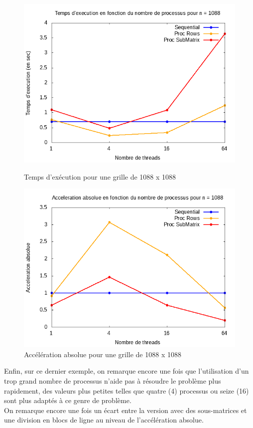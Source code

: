 \documentclass[10pt,a4paper]{article}
\begin{document}
\newpage
\begin{figure}[h]
  \centering
  \begin{minipage}[b]{0.49\textwidth}
	\includegraphics[width=\textwidth]{./Time/size_1088_time.png}
    \caption{Temps d'exécution pour une grille de 1088 x 1088}
  \end{minipage}
  \hfill
  \begin{minipage}[b]{0.49\textwidth}
    \includegraphics[width=\textwidth]{./Time/size_1088_acceleration.png}
    \caption{Accélération absolue pour une grille de 1088 x 1088}
  \end{minipage}
\end{figure}
Enfin, sur ce dernier exemple, on remarque encore une fois que l'utilisation d'un trop grand nombre de processus n'aide pas à résoudre le problème plus rapidement, des valeurs plus petites telles que quatre (4) processus ou seize (16) sont plus adaptés à ce genre de problème. \\
On remarque encore une fois un écart entre la version avec des sous-matrices et une division en blocs de ligne au niveau de l'accélération absolue.
\end{document}
